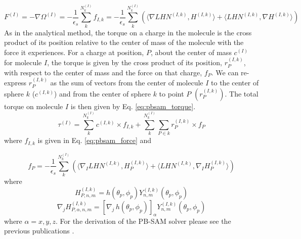 \documentclass[journal=jpcbfk, manuscript=article]{achemso}
\begin{document}
\begin{equation}
F^{(I)} = - \nabla \Omega^{(I)} =  -  \frac{1}{\epsilon_s} \sum_{k}^{N_k^{(I)}} f_{I,k} = -  \frac{1}{\epsilon_s} \sum_{k}^{N_k^{(I)}}( \langle \nabla LHN^{(I,k)}, H^{(I,k)} \rangle +  \langle LHN^{(I,k)}, \nabla H^{(I,k)} \rangle)
\label{eq:pbsam_force}
\end{equation}
%
As in the analytical method, the torque on a charge in the molecule is the cross product of its position relative to the center of mass of the molecule with the force it experiences. For a charge at position, \(P\), about the center of mass \(c^{(I)}\) for molecule \(I\), the torque is given by the cross product of its position, \(r_P^{(I,k)}\), with respect to the center of mass and the force on that charge, $f_P$. We can re-express \(r_P^{(I,k)}\) as the sum of vectors from the center of molecule $I$ to the center of sphere \(k\) (\(c^{(I,k)}\)) and from the center of sphere \(k\) to point $P$ \((r_P^{(I,k)})\). The total torque on molecule \(I\) is then given by Eq. \ref{eq:pbsam_torque}.
%
\begin{equation}
\tau^{(I)} =  \sum_{k}^{N_k^{(I)}} c^{(I,k)} \times   f_{I,k} + \sum_{k}^{N_k^{(I)}}  \sum_{P\in k} r_P^{(I,k)} \times f_P 
\label{eq:pbsam_torque}
\end{equation}
%
where \(f_{I,k}\) is given in Eq. \ref{eq:pbsam_force} and

\begin{equation}
f_P = -  \frac{1}{\epsilon_s} \sum_{k}^{N_k^{(I)}}( \langle \nabla_I LHN^{(I,k)}, H_P^{(I,k)} \rangle +  \langle LHN^{(I,k)}, \nabla_I H_P^{(I,k)} \rangle)
\label{eq:pbsam_torque_fp}
\end{equation}
%
where
\begin{equation}
H_{P,n,m}^{(I,k)} =h(\theta_p, \phi_p) Y_{n,m}^{(I,k)} (\theta_p, \phi_p) 
\label{eq:pbsam_hp}
\end{equation}
%
\begin{equation}
\nabla_j H_{P,\alpha, n,m}^{(I,k)} = \left [ \nabla_j \, h(\theta_p, \phi_p) \right ]_{\alpha}   Y_{n,m}^{(I,k)} (\theta_p, \phi_p) 
\label{eq:pbsam_derv_hp}
\end{equation}
%
where \(\alpha = x , y, z\). For the derivation of the PB-SAM solver please see the previous publications \cite{yap2010, yap2013} .
\end{document}
